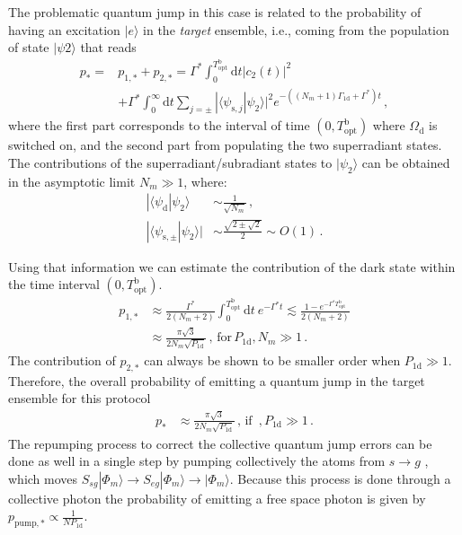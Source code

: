 \documentclass[twocolumn,pra,aps,superscriptaddress,showpacs]{revtex4-1}
\newcommand{\ket}[1]{|#1\rangle}
\newcommand{\braket}[2]{\langle #1|#2\rangle}
\def\oned{\mathrm{1d}}
\newcommand{\rs}{\mathrm{s}}
\newcommand{\rd}{\mathrm{d}}
\newcommand{\bb}{\mathrm{b}}
\begin{document}
The problematic quantum jump in this case is related to the probability of having an excitation $\ket{e}$ in the \emph{target} ensemble, i.e., coming from the population of state $\ket{\psi2}$ that reads
%
\begin{align}\label{eqSM:pbad11}
p_{*}
	=&p_{1,*} + p_{2,*}
	=\Gamma^*\int_0^{T_\mathrm{opt}^\bb} \rd t |c_2(t)|^2 \\
	& + \Gamma^*\int_{0}^\infty \rd t \sum_{j = \pm} |\langle \psi_{\rs,j} | \psi_2 \rangle|^2  e^{-\left( (N_m+1)\Gamma_\oned + \Gamma^*\right) t}\,, \nonumber
 \end{align}
where the first part corresponds to the interval of time $(0,T_\mathrm{opt}^\bb)$ where $\Omega_\rd$ is switched on, and the second part from populating the two superradiant states. The contributions of the superradiant/subradiant states to $\ket{\psi_2}$ can be obtained in the asymptotic limit $N_m\gg 1$, where:
%
\begin{align}\label{eqSM:overlap}
|\braket{\psi_\rd}{\psi_2}
	&\sim \frac{1}{\sqrt{N_m}}\,,\\
|\braket{\psi_{\rs,\pm }}{\psi_2}|
	&\sim \frac{\sqrt{2\pm \sqrt{2}}}{2}\sim O(1)\,.
\end{align}

Using that information we can estimate the contribution of the dark state within the time interval $(0,T_\mathrm{opt}^\bb)$.
\begin{align}\label{eq:pbad11}
p_{1,*}
	&\approx \frac{\Gamma^*}{2 (N_m+2)} \int_0^{T_\mathrm{opt}^\bb} \rd t\ e^{-\Gamma^* t}
	\lesssim \frac{1-e^{-\Gamma^* T_\mathrm{opt}^\bb}}{2(N_m+2)} \\
	&\approx \frac{\pi \sqrt{3}}{2 N_m\sqrt{P_\oned}}\,,\, \mathrm{for}\, P_\oned, N_m\gg 1 \,.
 \end{align}
The contribution of $p_{2,*}$ can always be shown to be smaller order when $P_\oned\gg 1$. Therefore, the overall probability of emitting a quantum jump in the target ensemble for this protocol 
\begin{align}
p_{*}
&\approx \frac{\pi\sqrt{3}}{2N_m\sqrt{P_\oned}}\,,\,\mathrm{if}\,\,\,, P_\oned\gg 1\,.
\end{align}
The repumping process to correct the collective quantum jump errors can be done as well in a single step by pumping collectively the atoms from $s\rightarrow g$ , which moves $S_{sg}\ket{\Phi_m}\rightarrow S_{eg}\ket{\Phi_m}\rightarrow\ket{\Phi_m}$.  Because this process is done through a collective photon the probability of emitting a free space photon is given by $p_{\mathrm{pump},*} \propto \frac{1}{NP_\oned}$.
\end{document}
